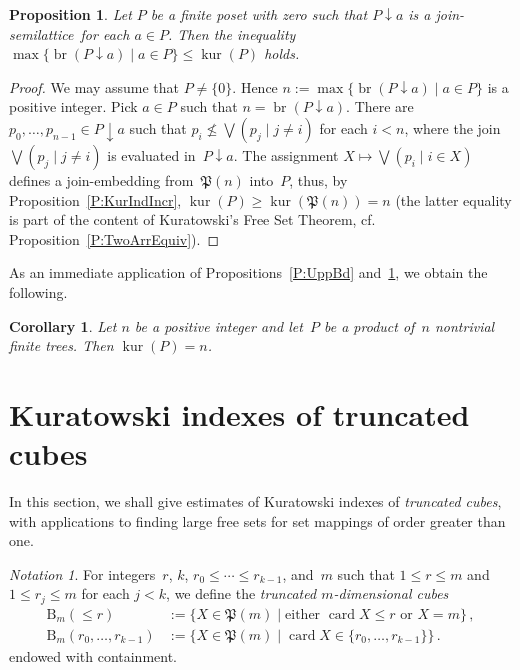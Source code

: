 \documentclass[psamsfonts,reqno]{amsart}
\theoremstyle{plain}
\newtheorem{proposition}[lemma]{Proposition}
\newtheorem{corollary}[lemma]{Corollary}
\theoremstyle{definition}
\theoremstyle{remark}
\newtheorem{notation}[lemma]{Notation}
\numberwithin{equation}{section}
\numberwithin{figure}{section}
\newcommand{\les}{\leqslant}
\DeclareMathOperator{\kur}{kur}
\DeclareMathOperator{\brd}{br}
\DeclareMathOperator{\card}{card}
\newcommand{\Pow}{\mathfrak{P}}
\newcommand{\famm}[2]{\left(#1\mid#2\right)}
\newcommand{\set}[1]{\{#1\}}
\newcommand{\setm}[2]{\set{#1\mid#2}}
\newcommand{\dnw}{\mathbin{\downarrow}}
\newcommand{\js}{join-sem\-i\-lat\-tice}
\newcommand{\rB}{\mathrm{B}}
\begin{document}
\begin{proposition}\label{P:kurgewbr}
Let $P$ be a finite poset with zero such that $P\dnw a$ is a \js\ for each $a\in P$. Then the inequality $\max\setm{\brd(P\dnw a)}{a\in P}\leq\kur(P)$ holds.
\end{proposition}

\begin{proof}
We may assume that $P\neq\set{0}$.
Hence $n:=\max\setm{\brd(P\dnw a)}{a\in P}$ is a positive integer. Pick $a\in P$ such that $n=\brd(P\dnw a)$. There are $p_0,\dots,p_{n-1}\in P\dnw a$ such that $p_i\nleq\bigvee\famm{p_j}{j\neq i}$ for each $i<n$, where the join $\bigvee\famm{p_j}{j\neq i}$ is evaluated in~$P\dnw a$. The assignment $X\mapsto\bigvee\famm{p_i}{i\in X}$ defines a join-embedding from~$\Pow(n)$ into~$P$, thus, by Proposition~\ref{P:KurIndIncr}, $\kur(P)\geq\kur(\Pow(n))=n$ (the latter equality is part of the content of Kuratowski's Free Set Theorem, cf. Proposition~\ref{P:TwoArrEquiv}).
\end{proof}

As an immediate application of Propositions~\ref{P:UppBd} and~\ref{P:kurgewbr}, we obtain the following.

\begin{corollary}\label{C:kur(prdntr)}
Let $n$ be a positive integer and let~$P$ be a product of~$n$ nontrivial finite trees. Then $\kur(P)=n$.
\end{corollary}

\section{Kuratowski indexes of truncated cubes}\label{S:Trunc}

In this section, we shall give estimates of Kuratowski indexes of \emph{truncated cubes}, with applications to finding large free sets for set mappings of order greater than one.

\begin{notation}\label{Not:B(k,m)}
For integers~$r$, $k$, $r_0\leq\cdots\leq r_{k-1}$, and~$m$ such that $1\leq r\leq m$ and $1\leq r_j\leq m$ for each $j<k$, we define the \emph{truncated $m$-dimensional cubes}
 \begin{align*}
 \rB_m({\les}r)&:=\setm{X\in\Pow(m)}{\text{either }\card X\leq r\text{ or }X=m}\,,\\
 \rB_m(r_0,\dots,r_{k-1})&:=
 \setm{X\in\Pow(m)}{\card X\in\set{r_0,\dots,r_{k-1}}}\,.
 \end{align*}
endowed with containment.
\end{notation}
\end{document}
